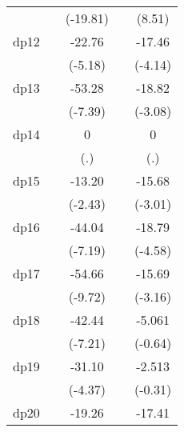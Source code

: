 {\begin{tabular}{l*{4}{c}}
            &                     &    (-19.81)         &                     &      (8.51)         \\
[1em]
dp12        &                     &      -22.76\sym{***}&                     &      -17.46\sym{***}\\
            &                     &     (-5.18)         &                     &     (-4.14)         \\
[1em]
dp13        &                     &      -53.28\sym{***}&                     &      -18.82\sym{**} \\
            &                     &     (-7.39)         &                     &     (-3.08)         \\
[1em]
dp14        &                     &           0         &                     &           0         \\
            &                     &         (.)         &                     &         (.)         \\
[1em]
dp15        &                     &      -13.20\sym{*}  &                     &      -15.68\sym{**} \\
            &                     &     (-2.43)         &                     &     (-3.01)         \\
[1em]
dp16        &                     &      -44.04\sym{***}&                     &      -18.79\sym{***}\\
            &                     &     (-7.19)         &                     &     (-4.58)         \\
[1em]
dp17        &                     &      -54.66\sym{***}&                     &      -15.69\sym{**} \\
            &                     &     (-9.72)         &                     &     (-3.16)         \\
[1em]
dp18        &                     &      -42.44\sym{***}&                     &      -5.061         \\
            &                     &     (-7.21)         &                     &     (-0.64)         \\
[1em]
dp19        &                     &      -31.10\sym{***}&                     &      -2.513         \\
            &                     &     (-4.37)         &                     &     (-0.31)         \\
[1em]
dp20        &                     &      -19.26\sym{**} &                     &      -17.41\sym{**} \\

\end{tabular}}
